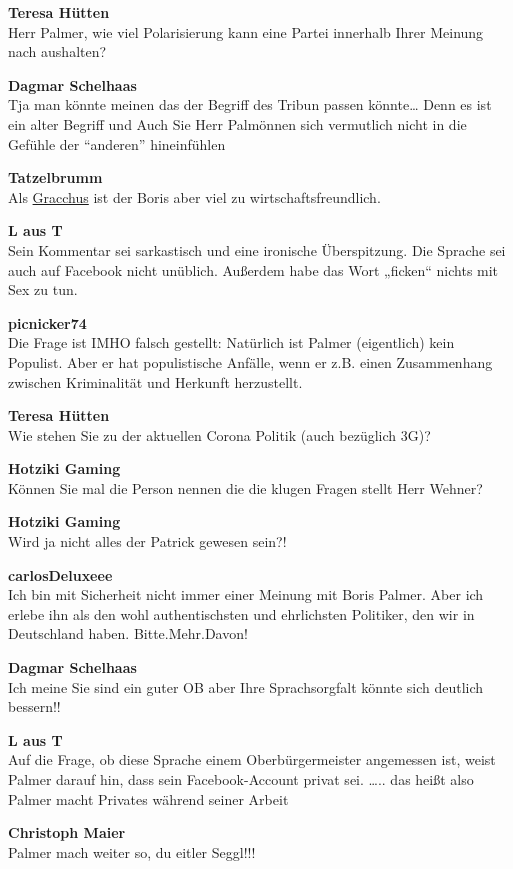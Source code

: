 \documentclass[]{article}
\begin{document}
\textbf{Teresa Hütten}\\
Herr Palmer, wie viel Polarisierung kann eine Partei innerhalb Ihrer
Meinung nach aushalten?

\textbf{Dagmar Schelhaas}\\
Tja man könnte meinen das der Begriff des Tribun passen könnte\ldots{}
Denn es ist ein alter Begriff und Auch Sie Herr Palmönnen sich
vermutlich nicht in die Gefühle der ``anderen'' hineinfühlen

\textbf{Tatzelbrumm}\\
Als \protect\hyperlink{Gracchus}{Gracchus} ist der Boris aber viel zu
wirtschaftsfreundlich.

\textbf{L aus T}\\
Sein Kommentar sei sarkastisch und eine ironische Überspitzung. Die
Sprache sei auch auf Facebook nicht unüblich. Außerdem habe das Wort
„ficken`` nichts mit Sex zu tun.

\textbf{picnicker74}\\
Die Frage ist IMHO falsch gestellt: Natürlich ist Palmer (eigentlich)
kein Populist. Aber er hat populistische Anfälle, wenn er z.B. einen
Zusammenhang zwischen Kriminalität und Herkunft herzustellt.

\textbf{Teresa Hütten}\\
Wie stehen Sie zu der aktuellen Corona Politik (auch bezüglich 3G)?

\textbf{Hotziki Gaming}\\
Können Sie mal die Person nennen die die klugen Fragen stellt Herr
Wehner?

\textbf{Hotziki Gaming}\\
Wird ja nicht alles der Patrick gewesen sein?!

\textbf{carlosDeluxeee}\\
Ich bin mit Sicherheit nicht immer einer Meinung mit Boris Palmer. Aber
ich erlebe ihn als den wohl authentischsten und ehrlichsten Politiker,
den wir in Deutschland haben. Bitte.Mehr.Davon!

\textbf{Dagmar Schelhaas}\\
Ich meine Sie sind ein guter OB aber Ihre Sprachsorgfalt könnte sich
deutlich bessern!!

\textbf{L aus T}\\
Auf die Frage, ob diese Sprache einem Oberbürgermeister angemessen ist,
weist Palmer darauf hin, dass sein Facebook-Account privat sei.
\ldots{}.. das heißt also Palmer macht Privates während seiner Arbeit

\textbf{Christoph Maier}\\
Palmer mach weiter so, du eitler Seggl!!!
\end{document}
